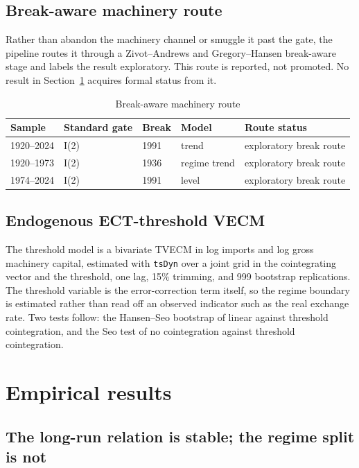 \documentclass[11pt]{article}
\begin{document}
\FloatBarrier
\subsection{Break-aware machinery route}

Rather than abandon the machinery channel or smuggle it past the gate, the pipeline routes it through a Zivot--Andrews and Gregory--Hansen break-aware stage and labels the result exploratory. This route is reported, not promoted. No result in Section~\ref{sec:results} acquires formal status from it.

\begin{table}[H]
\centering
\caption{Break-aware machinery route}
\label{tab:route}
\begin{tabular}{p{2.3cm}p{2.2cm}p{2.2cm}p{2.8cm}p{4.2cm}}
\toprule
\textbf{Sample} & \textbf{Standard gate} & \textbf{Break} & \textbf{Model} & \textbf{Route status} \\
\midrule
1920--2024 & I(2) & 1991 & trend & exploratory break route \\
1920--1973 & I(2) & 1936 & regime trend & exploratory break route \\
1974--2024 & I(2) & 1991 & level & exploratory break route \\
\bottomrule
\end{tabular}
\end{table}

\FloatBarrier
\subsection{Endogenous ECT-threshold VECM}

The threshold model is a bivariate TVECM in log imports and log gross machinery capital, estimated with \texttt{tsDyn} over a joint grid in the cointegrating vector and the threshold, one lag, 15\% trimming, and 999 bootstrap replications. The threshold variable is the error-correction term itself, so the regime boundary is estimated rather than read off an observed indicator such as the real exchange rate. Two tests follow: the Hansen--Seo bootstrap of linear against threshold cointegration, and the Seo test of no cointegration against threshold cointegration.

\FloatBarrier
\section{Empirical results}
\label{sec:results}

\subsection{The long-run relation is stable; the regime split is not}
\end{document}
